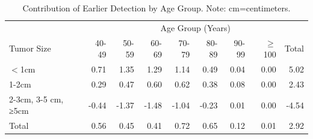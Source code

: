 \documentclass[11pt,letterpaper]{article}
\theoremstyle{plain}
\theoremstyle{remark}
\numberwithin{equation}{section}
\begin{document}
\begin{center}
  \begin{table}[h]
\begin{tabular}{@{}l rrrr rrrr@{}}
& \multicolumn{8}{c}{Age Group (Years)}\\ 
 Tumor Size &40-49&50-59&60-69&70-79&80-89&90-99&$\geq$100&Total\\
  \midrule
$<$1cm&0.71&1.35&1.29&1.14&0.49&0.04&0.00&5.02\\
1-2cm&0.29&0.47&0.60&0.62&0.38&0.08&0.00&2.43\\
2-3cm, 3-5 cm, ≥5cm&-0.44&-1.37&-1.48&-1.04&-0.23&0.01&0.00&-4.54\\
  \bottomrule
 Total&0.56&0.45&0.41&0.72&0.65&0.12&0.01&2.92\\
\end{tabular}
\caption{Contribution of Earlier Detection by Age Group.  Note: cm=centimeters.}\end{table}
\end{center}
\end{document}
